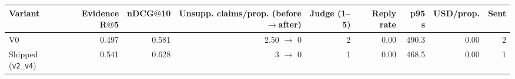 \begin{tabular}{lrrrrrrrr}
\toprule
Variant & Evidence R@5 & nDCG@10 & Unsupp. claims/prop. (before$\to$after) & Judge (1--5) & Reply rate & p95 s & USD/prop. & Sent \\
\midrule
V0 & 0.497 & 0.581 & 2.50 $\to$ 0 & 2 & 0.00 & 490.3 & 0.00 & 2 \\
Shipped (\texttt{v2\_v4}) & 0.541 & 0.628 & 3 $\to$ 0 & 1 & 0.00 & 468.5 & 0.00 & 1 \\
\bottomrule
\end{tabular}
